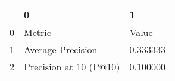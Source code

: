 \begin{tabular}{lll}
\toprule
 & 0 & 1 \\
\midrule
0 & Metric & Value \\
1 & Average Precision & 0.333333 \\
2 & Precision at 10 (P@10) & 0.100000 \\
\bottomrule
\end{tabular}
